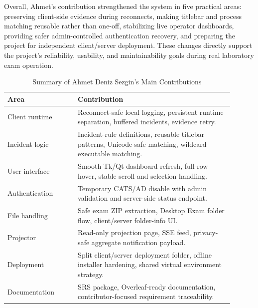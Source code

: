 Overall, Ahmet's contribution strengthened the system in five practical areas: preserving client-side evidence during reconnects, making titlebar and process matching reusable rather than one-off, stabilizing live operator dashboards, providing safer admin-controlled authentication recovery, and preparing the project for independent client/server deployment. These changes directly support the project's reliability, usability, and maintainability goals during real laboratory exam operation.

\begin{table}[htbp]
\caption{Summary of Ahmet Deniz Sezgin's Main Contributions}
\centering
\begin{tabular}{p{0.28\linewidth} p{0.62\linewidth}}
\toprule
\textbf{Area} & \textbf{Contribution} \\
\midrule
Client runtime & Reconnect-safe local logging, persistent runtime separation, buffered incidents, evidence retry. \\
Incident logic & Incident-rule definitions, reusable titlebar patterns, Unicode-safe matching, wildcard executable matching. \\
User interface & Smooth Tk/Qt dashboard refresh, full-row hover, stable scroll and selection handling. \\
Authentication & Temporary CATS/AD disable with admin validation and server-side status endpoint. \\
File handling & Safe exam ZIP extraction, Desktop Exam folder flow, client/server folder-info UI. \\
Projector & Read-only projection page, SSE feed, privacy-safe aggregate notification payload. \\
Deployment & Split client/server deployment folder, offline installer hardening, shared virtual environment strategy. \\
Documentation & SRS package, Overleaf-ready documentation, contributor-focused requirement traceability. \\
\bottomrule
\end{tabular}
\label{tab:ahmet-contrib}
\end{table}

